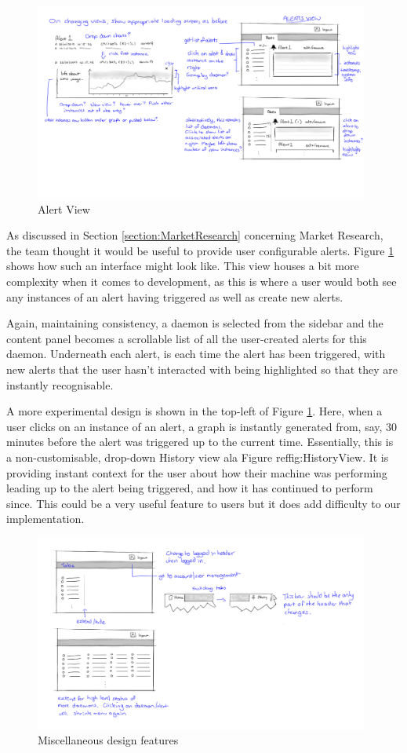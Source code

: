 \documentclass{l3proj}
\begin{document}
\begin{figure}[H]
\centering
\includegraphics[width=110mm]{Concept_Designs/AlertView.png}
\caption{Alert View}
\label{fig:AlertView}
\end{figure}

As discussed in Section \ref{section:MarketResearch} concerning Market Research, the team thought it would be useful to provide user configurable alerts. Figure \ref{fig:AlertView} shows how such an interface might look like. This view houses a bit more complexity when it comes to development, as this is where a user would both see any instances of an alert having triggered as well as create new alerts.

Again, maintaining consistency, a daemon is selected from the sidebar and the content panel becomes a scrollable list of all the user-created alerts for this daemon. Underneath each alert, is each time the alert has been triggered, with new alerts that the user hasn't interacted with being highlighted so that they are instantly recognisable.

A more experimental design is shown in the top-left of Figure \ref{fig:AlertView}. Here, when a user clicks on an instance of an alert, a graph is instantly generated from, say, 30 minutes before the alert was triggered up to the current time. Essentially, this is a non-customisable, drop-down History view ala Figure ref{fig:HistoryView}. It is providing instant context for the user about how their machine was performing leading up to the alert being triggered, and how it has continued to perform since. This could be a very useful feature to users but it does add difficulty to our implementation.

\begin{figure}[H]
\centering
\includegraphics[width=110mm]{Concept_Designs/Misc.png}
\caption{Miscellaneous design features}
\label{fig:MiscDesign}
\end{figure}
\end{document}
